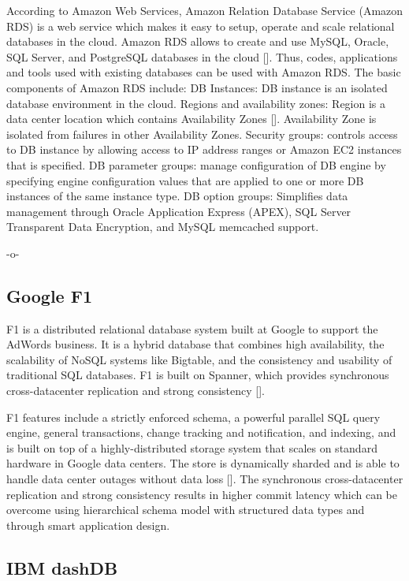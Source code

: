 According to Amazon Web Services, Amazon Relation Database Service
(Amazon RDS) is a web service which makes it easy to setup, operate
and scale relational databases in the cloud. Amazon RDS allows to
create and use MySQL, Oracle, SQL Server, and PostgreSQL databases in
the cloud [\cite{www-AmazonRDS}]. Thus, codes, applications and tools
used with existing databases can be used with Amazon RDS. The basic
components of Amazon RDS include: DB Instances: DB instance is an
isolated database environment in the cloud. Regions and availability
zones: Region is a data center location which contains Availability
Zones [\cite{www-AmazonRDSComponents}]. Availability Zone is isolated
from failures in other Availability Zones. Security groups: controls
access to DB instance by allowing access to IP address ranges or
Amazon EC2 instances that is specified. DB parameter groups: manage
configuration of DB engine by specifying engine configuration values
that are applied to one or more DB instances of the same instance
type. DB option groups: Simplifies data management through Oracle
Application Express (APEX), SQL Server Transparent Data Encryption,
and MySQL memcached support.

     -o-

     
\subsection{Google F1}

F1 is a distributed relational database system built at Google to
support the AdWords business. It is a hybrid database that combines
high availability, the scalability of NoSQL systems like Bigtable, and
the consistency and usability of traditional SQL databases. F1 is
built on Spanner, which provides synchronous cross-datacenter
replication and strong consistency [\cite{paper-F1}].
     
F1 features include a strictly enforced schema, a powerful parallel
SQL query engine, general transactions, change tracking and
notification, and indexing, and is built on top of a
highly-distributed storage system that scales on standard hardware in
Google data centers. The store is dynamically sharded and is able to
handle data center outages without data loss [\cite{paper-RDBMS}]. The
synchronous cross-datacenter replication and strong consistency
results in higher commit latency which can be overcome using
hierarchical schema model with structured data types and through smart
application design.
     

\subsection{IBM dashDB }

